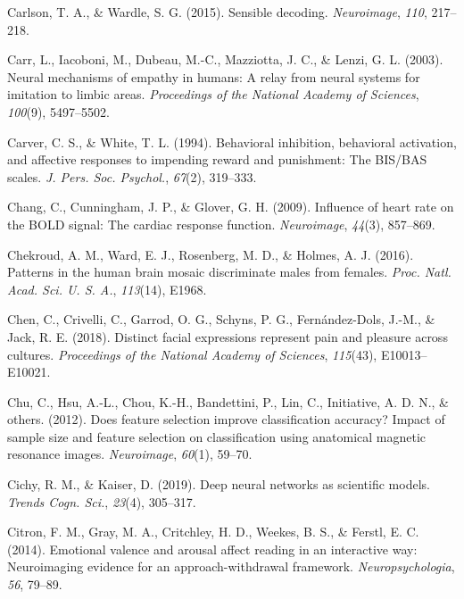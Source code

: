 \documentclass[11pt,american,a4paper,oneside,]{memoir} %
\begin{document}
\leavevmode\hypertarget{ref-Carlson2015-bz}{}%
Carlson, T. A., \& Wardle, S. G. (2015). Sensible decoding. \emph{Neuroimage}, \emph{110}, 217--218.

\leavevmode\hypertarget{ref-carr2003neural}{}%
Carr, L., Iacoboni, M., Dubeau, M.-C., Mazziotta, J. C., \& Lenzi, G. L. (2003). Neural mechanisms of empathy in humans: A relay from neural systems for imitation to limbic areas. \emph{Proceedings of the National Academy of Sciences}, \emph{100}(9), 5497--5502.

\leavevmode\hypertarget{ref-Carver1994-wp}{}%
Carver, C. S., \& White, T. L. (1994). Behavioral inhibition, behavioral activation, and affective responses to impending reward and punishment: The BIS/BAS scales. \emph{J. Pers. Soc. Psychol.}, \emph{67}(2), 319--333.

\leavevmode\hypertarget{ref-Chang2009-vu}{}%
Chang, C., Cunningham, J. P., \& Glover, G. H. (2009). Influence of heart rate on the BOLD signal: The cardiac response function. \emph{Neuroimage}, \emph{44}(3), 857--869.

\leavevmode\hypertarget{ref-Chekroud2016-tc}{}%
Chekroud, A. M., Ward, E. J., Rosenberg, M. D., \& Holmes, A. J. (2016). Patterns in the human brain mosaic discriminate males from females. \emph{Proc. Natl. Acad. Sci. U. S. A.}, \emph{113}(14), E1968.

\leavevmode\hypertarget{ref-chen2018distinct}{}%
Chen, C., Crivelli, C., Garrod, O. G., Schyns, P. G., Fernández-Dols, J.-M., \& Jack, R. E. (2018). Distinct facial expressions represent pain and pleasure across cultures. \emph{Proceedings of the National Academy of Sciences}, \emph{115}(43), E10013--E10021.

\leavevmode\hypertarget{ref-chu2012does}{}%
Chu, C., Hsu, A.-L., Chou, K.-H., Bandettini, P., Lin, C., Initiative, A. D. N., \& others. (2012). Does feature selection improve classification accuracy? Impact of sample size and feature selection on classification using anatomical magnetic resonance images. \emph{Neuroimage}, \emph{60}(1), 59--70.

\leavevmode\hypertarget{ref-Cichy2019-zf}{}%
Cichy, R. M., \& Kaiser, D. (2019). Deep neural networks as scientific models. \emph{Trends Cogn. Sci.}, \emph{23}(4), 305--317.

\leavevmode\hypertarget{ref-citron2014emotional}{}%
Citron, F. M., Gray, M. A., Critchley, H. D., Weekes, B. S., \& Ferstl, E. C. (2014). Emotional valence and arousal affect reading in an interactive way: Neuroimaging evidence for an approach-withdrawal framework. \emph{Neuropsychologia}, \emph{56}, 79--89.
\end{document}
